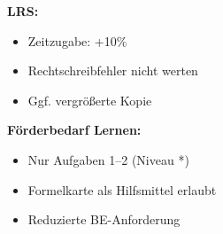 \documentclass[11pt, a4paper]{article}
\begin{document}
\textbf{LRS:}
\begin{itemize}
    \item Zeitzugabe: +10\%
    \item Rechtschreibfehler nicht werten
    \item Ggf. vergrößerte Kopie
\end{itemize}

\textbf{Förderbedarf Lernen:}
\begin{itemize}
    \item Nur Aufgaben 1--2 (Niveau *)
    \item Formelkarte als Hilfsmittel erlaubt
    \item Reduzierte BE-Anforderung
\end{itemize}
\end{document}
